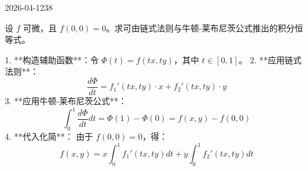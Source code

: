 \begin{mistake}{2026-04-12}{38}

\begin{problemcontent}
设 \( f \) 可微，且 \( f(0,0)=0 \)。求可由链式法则与牛顿-莱布尼茨公式推出的积分恒等式。
\end{problemcontent}

\begin{solutioncontent}
1. **构造辅助函数**：令 \( \Phi(t) = f(tx, ty) \)，其中 \( t \in [0, 1] \)。
2. **应用链式法则**：
\[ \frac{d\Phi}{dt} = f_1'(tx, ty) \cdot x + f_2'(tx, ty) \cdot y \]
3. **应用牛顿-莱布尼茨公式**：
\[ \int_0^1 \frac{d\Phi}{dt} dt = \Phi(1) - \Phi(0) = f(x, y) - f(0, 0) \]
4. **代入化简**：
由于 \( f(0,0)=0 \)，得：
\[ f(x, y) = x \int_0^1 f_1'(tx, ty) dt + y \int_0^1 f_2'(tx, ty) dt \]
\end{solutioncontent}


\end{mistake}
